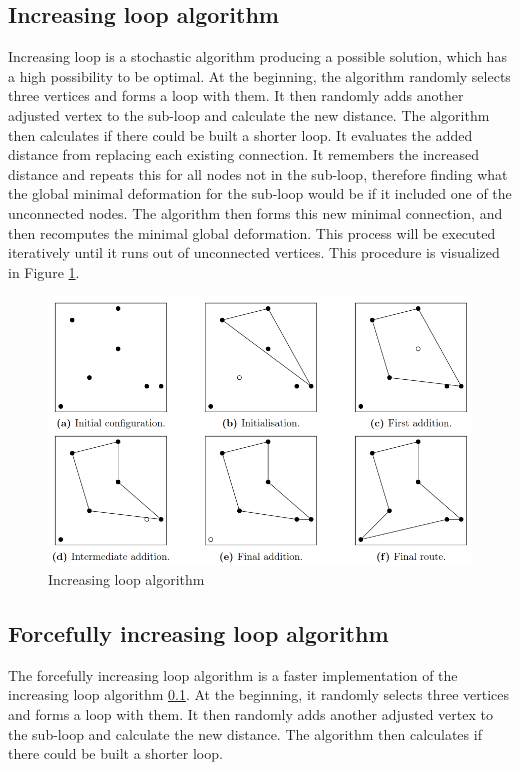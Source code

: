 \documentclass[conference]{IEEEtran}
\begin{document}
	\subsection{Increasing loop algorithm}\label{inc_loop}
	Increasing loop is a stochastic algorithm producing a possible solution, which has a high possibility to be optimal. At the beginning, the algorithm randomly selects three vertices and forms a loop with them. It then randomly adds another adjusted vertex to the sub-loop and calculate the new distance. The algorithm then calculates if there could be built a shorter loop. It evaluates the added distance from replacing each existing connection. It remembers the increased distance and repeats this for all nodes not in the sub-loop, therefore finding what the global minimal deformation for the sub-loop would be if it included one of the unconnected nodes. The algorithm then forms this new minimal connection, and then recomputes the minimal global deformation. This process will be executed iteratively until it runs out of unconnected vertices. This procedure is visualized in Figure \ref{fig:increasing_loop}.
	
	\begin{figure}[h]
    		\centering
    		\includegraphics[width=\textwidth/2]{increasing_loop.PNG}
    		\caption{Increasing loop algorithm \cite{tspalgo2016}}
    		\label{fig:increasing_loop}
	\end{figure}
	    
	\subsection{Forcefully increasing loop algorithm}
	The forcefully increasing loop algorithm is a faster implementation of the increasing loop algorithm \ref{inc_loop}. At the beginning, it randomly selects three vertices and forms a loop with them. It then randomly adds another adjusted vertex to the sub-loop and calculate the new distance. The algorithm then calculates if there could be built a shorter loop.
\end{document}
